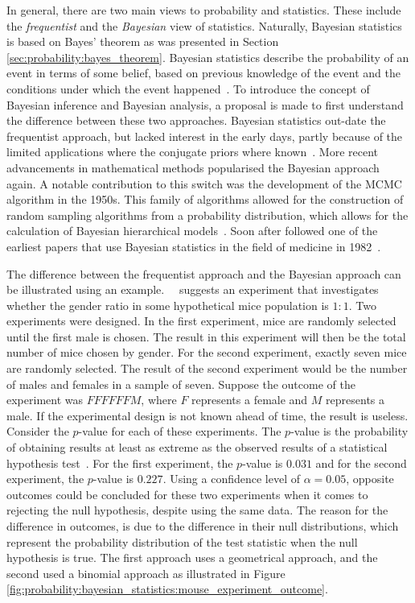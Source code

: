 In general, there are two main views to probability and statistics. These include the \textit{frequentist} and the \textit{Bayesian} view of statistics. Naturally, Bayesian statistics is based on Bayes' theorem as was presented in Section \ref{sec:probability:bayes_theorem}. Bayesian statistics describe the probability of an event in terms of some belief, based on previous knowledge of the event and the conditions under which the event happened~\cite{ref:hackenberger:2019}. To introduce the concept of Bayesian inference and Bayesian analysis, a proposal is made to first understand the difference between these two approaches. Bayesian statistics out-date the frequentist approach, but lacked interest in the early days, partly because of the limited applications where the conjugate priors where known~\cite{ref:hackenberger:2019}. More recent advancements in mathematical methods popularised the Bayesian approach again. A notable contribution to this switch was the development of the \acf{MCMC} algorithm in the 1950s. This family of algorithms allowed for the construction of random sampling algorithms from a probability distribution, which allows for the calculation of Bayesian hierarchical models~\cite{ref:hackenberger:2019}. Soon after followed one of the earliest papers that use Bayesian statistics in the field of medicine in 1982~\cite{ref:ashby:2006}.

The difference between the frequentist approach and the Bayesian approach can be illustrated using an example.~\citeauthor{ref:hackenberger:2019}~\cite{ref:hackenberger:2019} suggests an experiment that investigates whether the gender ratio in some hypothetical mice population is $1:1$. Two experiments were designed. In the first experiment, mice are randomly selected until the first male is chosen. The result in this experiment will then be the total number of mice chosen by gender. For the second experiment, exactly seven mice are randomly selected. The result of the second experiment would be the number of males and females in a sample of seven. Suppose the outcome of the experiment was $FFFFFFM$, where $F$ represents a female and $M$ represents a male. If the experimental design is not known ahead of time, the result is useless. Consider the $p$-value for each of these experiments. The $p$-value is the probability of obtaining results at least as extreme as the observed results of a statistical hypothesis test~\cite{ref:beers:2022}. For the first experiment, the $p$-value is $0.031$ and for the second experiment, the $p$-value is $0.227$. Using a confidence level of $\alpha = 0.05$, opposite outcomes could be concluded for these two experiments when it comes to rejecting the null hypothesis, despite using the same data. The reason for the difference in outcomes, is due to the difference in their null distributions, which represent the probability distribution of the test statistic when the null hypothesis is true. The first approach uses a geometrical approach, and the second used a binomial approach as illustrated in Figure \ref{fig:probability:bayesian_statistics:mouse_experiment_outcome}.


